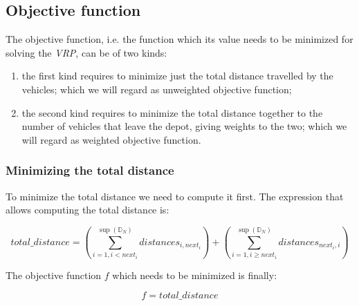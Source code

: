 \documentclass[../main.tex]{subfiles}
\begin{document}
\subsection{Objective function}
\label{subsec:objective-function}
The objective function, i.e. the function which its value needs to be minimized for solving the \textit{VRP}, can be of two kinds:
\begin{enumerate}
    \item the first kind requires to minimize just the total distance travelled by the vehicles; which we will regard as unweighted objective function;
    \item the second kind requires to minimize the total distance together to the number of vehicles that leave the depot, giving weights to the two; which we will regard as weighted objective function.
\end{enumerate}
\subsubsection{Minimizing the total distance}
\label{subsubsec:minimizing-total-distance}
To minimize the total distance we need to compute it first. The expression that allows computing the total distance is:
\begin{center}
    \begin{equation}
        total\_distance = (\sum_{i = 1, i < next_i}^{\sup{}(\mathbb{D}_N)}{distances_{i, next_i}}) + (\sum_{i = 1, i \geq next_i}^{\sup{}(\mathbb{D}_N)}{distances_{next_i, i}})
    \end{equation}
\end{center}
The objective function $f$ which needs to be minimized is finally:
\begin{center}
    \begin{equation}
        f = total\_distance
    \end{equation}
\end{center}
\end{document}
